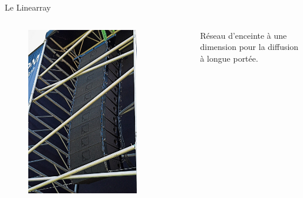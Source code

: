 \documentclass[aspectratio=169]{beamer}
\begin{document}
\begin{frame}{Le Linearray}
\begin{columns}[t]\small
  \begin{column}{.33\textwidth}
  	\begin{figure}[!h]
	\includegraphics[width=0.8\textwidth]{figure/800px-L-Acoustics_DSC0908-02EC.jpg}
	\end{figure}

  \end{column}
  \begin{column}{.66\textwidth}
  	\vspace{2cm}
  	
	Réseau d'enceinte à une dimension pour la diffusion à longue portée.
  \end{column}
\end{columns}
\end{frame}
\end{document}
